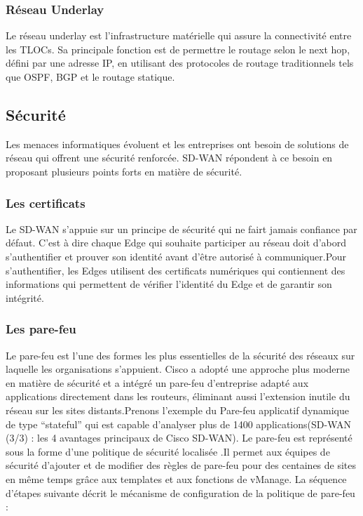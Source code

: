 \subsubsection{Réseau Underlay }

Le réseau underlay est l'infrastructure matérielle qui assure la connectivité entre les TLOCs. Sa principale fonction est de permettre le routage selon le next hop, défini par une adresse IP, en utilisant des protocoles de routage traditionnels tels que OSPF, BGP et le routage statique.

\subsection{Sécurité}

Les menaces informatiques évoluent et les entreprises ont besoin de solutions de réseau qui offrent une sécurité renforcée. SD-WAN répondent à ce besoin en proposant plusieurs points forts en matière de sécurité.

\subsubsection{Les certificats }
Le SD-WAN s'appuie sur un principe de sécurité qui ne fairt jamais confiance par défaut. C’est à dire chaque Edge qui souhaite participer au réseau doit d'abord s'authentifier et prouver son identité avant d'être autorisé à communiquer.Pour s'authentifier, les Edges utilisent des certificats numériques qui contiennent des informations qui permettent de vérifier l'identité du Edge et de garantir son intégrité.

\subsubsection{Les pare-feu }


Le pare-feu est l'une des formes les plus essentielles de la sécurité des réseaux sur laquelle les organisations s'appuient. 
Cisco a adopté une approche plus moderne en matière de sécurité et a intégré un pare-feu d'entreprise adapté aux applications directement dans les routeurs, éliminant aussi l'extension inutile du réseau sur les sites distants.Prenons l’exemple du Pare-feu applicatif dynamique de type “stateful” qui est capable d’analyser plus de 1400 applications(SD-WAN (3/3) : les 4 avantages principaux de Cisco SD-WAN). Le pare-feu est représenté sous la forme d'une politique de sécurité localisée .Il permet aux équipes de sécurité d'ajouter et de modifier des règles de pare-feu pour des centaines de sites en même temps grâce aux templates et aux fonctions de vManage.  
La séquence d'étapes suivante décrit le mécanisme de configuration de la politique de pare-feu :


